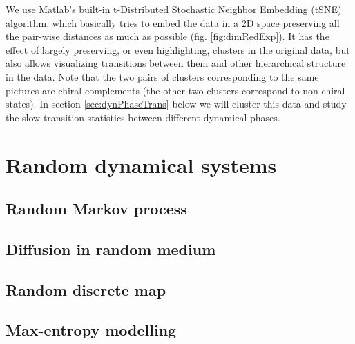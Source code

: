 \documentclass[11pt]{article}
\renewcommand{\=}[1]{\stackrel{#1}{=}} %
\renewcommand{\(}{\left (}
\renewcommand{\)}{\right  )}
\renewcommand{\[}{\left [}
\renewcommand{\]}{\right ]}
\newcommand{\<}{\left <}
\renewcommand{\>}{\right >}
\theoremstyle{definition}
\theoremstyle{remark}
\begin{document}
We use Matlab's built-in t-Distributed Stochastic Neighbor Embedding (tSNE) algorithm, which basically tries to embed the data in a 2D space preserving all the pair-wise distances as much as possible (fig. \ref{fig:dimRedExp}). It has the effect of largely preserving, or even highlighting, clusters in the original data, but also allows visualizing transitions between them and other hierarchical structure in the data. Note that the two pairs of clusters corresponding to the same pictures are chiral complements (the other two clusters correspond to non-chiral states). In section \ref{sec:dynPhaseTrans} below we will cluster this data and study the slow transition statistics between different dynamical phases.



\section{Random dynamical systems}
\subsection{Random Markov process}
\subsection{Diffusion in random medium}
\subsection{Random discrete map}
\subsection{Max-entropy modelling}


%

\end{document}
